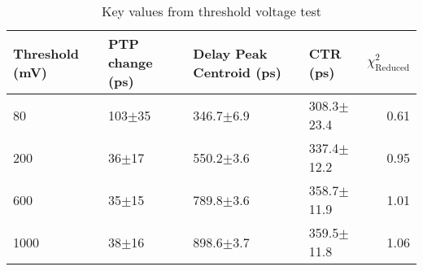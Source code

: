 \begin{table}
\caption{\label{tab:thresholdtest} Key values from threshold voltage test}
\begin{tabular}{llllr}
\hline
Threshold (mV) & PTP change (ps) & Delay Peak Centroid (ps) & CTR (ps) & $\chi^2_\text{Reduced}$\\
\hline
80        &  103$\pm$35 &  346.7$\pm$6.9 &  308.3$\pm$23.4 &        0.61 \\
200       &   36$\pm$17 &  550.2$\pm$3.6 &  337.4$\pm$12.2 &        0.95 \\
600       &   35$\pm$15 &  789.8$\pm$3.6 &  358.7$\pm$11.9 &        1.01 \\
1000      &   38$\pm$16 &  898.6$\pm$3.7 &  359.5$\pm$11.8 &        1.06 \\
\hline
\end{tabular}
\end{table}